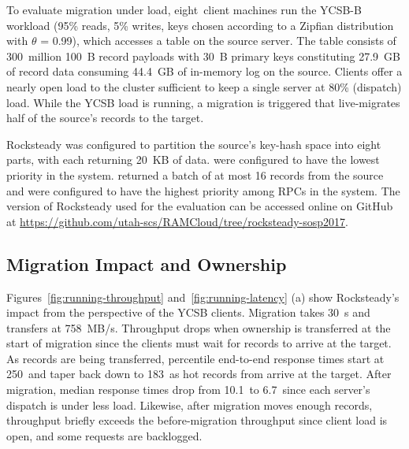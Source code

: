 
To evaluate migration under load, eight~client machines run the YCSB-B~\cite{ycsb}
workload (95\% reads, 5\% writes, keys chosen according to a Zipfian
distribution with $\theta$ = 0.99), which accesses a table on the source
server. The table consists of 300~million 100~B record payloads with 30~B
primary keys constituting 27.9~GB of record data consuming 44.4~GB of in-memory
log on the source. Clients offer a nearly open load to the cluster sufficient to keep
a single server at 80\% (dispatch) load.  While the YCSB load is running, a
migration is triggered that live-migrates half of the source's records
to the target.

Rocksteady was configured to partition the source's key-hash space into
eight parts, with each \pull returning 20~KB of data. \pulls were configured
to have the lowest priority in the system. \priopulls returned a batch
of at most 16 records from the
source and were configured
to have the highest priority among RPCs in the system. The version of Rocksteady
used for the evaluation can be accessed online on GitHub at\linebreak{}
{\url{https://github.com/utah-scs/RAMCloud/tree/rocksteady-sosp2017}}.

\subsection{Migration Impact and Ownership}
\label{sec:e2e}
Figures~\ref{fig:running-throughput} and~\ref{fig:running-latency} (a) show
Rocksteady's impact from the perspective of the YCSB clients. Migration
takes 30~s and transfers at 758~MB/s. Throughput drops when ownership is
transferred at the start of migration since the clients must wait for records
to arrive at the target. As records are being transferred, \nnnth percentile
end-to-end response times start at 250~\us and taper back down to 183~\us as
hot records from \priopulls arrive at the target. After migration, median
response times drop from 10.1~\us to 6.7~\us since each server's dispatch is under
less load. Likewise, after migration moves enough records, throughput briefly
exceeds the before-migration throughput since client load is open, and some
requests are backlogged.

